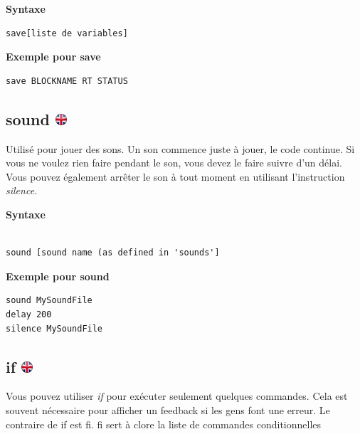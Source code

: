 \documentclass[
]{book}
\begin{document}
\textbf{Syntaxe}

\begin{verbatim}
save[liste de variables]
\end{verbatim}

\textbf{Exemple pour save}

\begin{verbatim}
save BLOCKNAME RT STATUS
\end{verbatim}

\hypertarget{sound}{%
\subsection[sound ]{\texorpdfstring{sound \href{https://www.psytoolkit.org/doc3.4.0/syntax.html\#task-sound}{\protect\includegraphics{img/ukflag.png}}}{sound }}\label{sound}}

Utilisé pour jouer des sons. Un son commence juste à jouer, le code continue. Si vous ne voulez rien faire pendant le son, vous devez le faire suivre d'un délai. Vous pouvez également arrêter le son à tout moment en utilisant l'instruction \emph{silence.}

\textbf{Syntaxe}

\begin{verbatim}

sound [sound name (as defined in 'sounds']
\end{verbatim}

\textbf{Exemple pour sound}

\begin{verbatim}
sound MySoundFile
delay 200
silence MySoundFile
\end{verbatim}

\hypertarget{if}{%
\subsection[if ]{\texorpdfstring{if \href{https://www.psytoolkit.org/doc3.4.0/syntax.html\#task-if}{\protect\includegraphics{img/ukflag.png}}}{if }}\label{if}}

Vous pouvez utiliser \emph{if} pour exécuter seulement quelques commandes. Cela est souvent nécessaire pour afficher un feedback si les gens font une erreur. Le contraire de if est fi. fi sert à clore la liste de commandes conditionnelles
\end{document}
